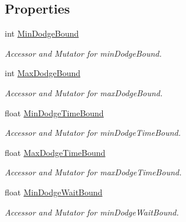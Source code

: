 \subsection*{Properties}
\begin{DoxyCompactItemize}
\item 
int \mbox{\hyperlink{class_individual_a6dc47b346e6cdd288773b44e6c0fc272}{Min\+Dodge\+Bound}}
\begin{DoxyCompactList}\small\item\em Accessor and Mutator for min\+Dodge\+Bound. \end{DoxyCompactList}\item 
int \mbox{\hyperlink{class_individual_adb55c9ec4a4012582a4c35b654db8f21}{Max\+Dodge\+Bound}}
\begin{DoxyCompactList}\small\item\em Accessor and Mutator for max\+Dodge\+Bound. \end{DoxyCompactList}\item 
float \mbox{\hyperlink{class_individual_ae3b13d55d1ba206fff541af02308c618}{Min\+Dodge\+Time\+Bound}}
\begin{DoxyCompactList}\small\item\em Accessor and Mutator for min\+Dodge\+Time\+Bound. \end{DoxyCompactList}\item 
float \mbox{\hyperlink{class_individual_af7985d4dfe4001bc062d3dc8f778e5a5}{Max\+Dodge\+Time\+Bound}}
\begin{DoxyCompactList}\small\item\em Accessor and Mutator for max\+Dodge\+Time\+Bound. \end{DoxyCompactList}\item 
float \mbox{\hyperlink{class_individual_a86b79a3255c7ea9ffa8c063c999cdc0a}{Min\+Dodge\+Wait\+Bound}}
\begin{DoxyCompactList}\small\item\em Accessor and Mutator for min\+Dodge\+Wait\+Bound. \end{DoxyCompactList}\item 

\end{DoxyCompactItemize}
